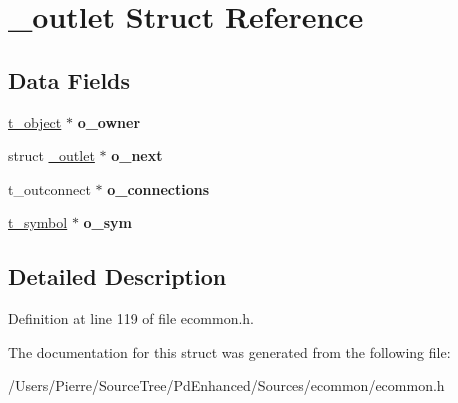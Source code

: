 \hypertarget{struct__outlet}{\section{\-\_\-outlet Struct Reference}
\label{struct__outlet}
}
\subsection*{Data Fields}
\begin{DoxyCompactItemize}
\item 
\hypertarget{struct__outlet_a7bdd65bdf46102a176835f19b3a2305b}{\hyperlink{struct__text}{t\-\_\-object} $\ast$ {\bfseries o\-\_\-owner}}\label{struct__outlet_a7bdd65bdf46102a176835f19b3a2305b}

\item 
\hypertarget{struct__outlet_ae26edec286a8bef11baa15ac0b9480e8}{struct \hyperlink{struct__outlet}{\-\_\-outlet} $\ast$ {\bfseries o\-\_\-next}}\label{struct__outlet_ae26edec286a8bef11baa15ac0b9480e8}

\item 
\hypertarget{struct__outlet_a18a291d6dfc4d4f5c380381138774af4}{t\-\_\-outconnect $\ast$ {\bfseries o\-\_\-connections}}\label{struct__outlet_a18a291d6dfc4d4f5c380381138774af4}

\item 
\hypertarget{struct__outlet_a305d36ab508da845dc8909a4b8570f9a}{\hyperlink{struct__symbol}{t\-\_\-symbol} $\ast$ {\bfseries o\-\_\-sym}}\label{struct__outlet_a305d36ab508da845dc8909a4b8570f9a}

\end{DoxyCompactItemize}


\subsection{Detailed Description}


Definition at line 119 of file ecommon.\-h.



The documentation for this struct was generated from the following file\-:\begin{DoxyCompactItemize}
\item 
/\-Users/\-Pierre/\-Source\-Tree/\-Pd\-Enhanced/\-Sources/ecommon/ecommon.\-h\end{DoxyCompactItemize}
